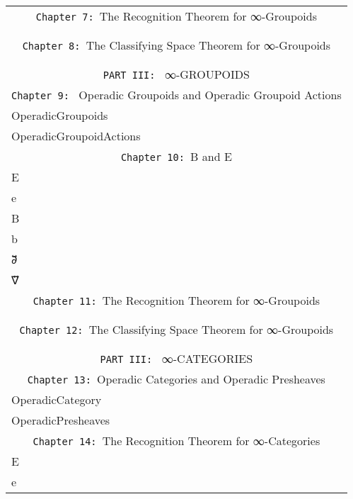 \documentclass{book}
\theoremstyle{definition}
\begin{document}
{\begin{longtable}{|| l || l ||}
\hline
  & \\
\hline \hline
\multicolumn{2}{||c||}{\texttt{Chapter 7: }The Recognition Theorem for ∞-Groupoids} \\
\hline \hline
 & \\
\hline
 & \\
\multicolumn{2}{||c||}{\texttt{Chapter 8: }The Classifying Space Theorem for ∞-Groupoids} \\
\hline \hline
 & \\
\hline
 & \\
\hline \hline
\multicolumn{2}{||c||}{\texttt{PART III: } ∞-GROUPOIDS} \\
\hline \hline
\multicolumn{2}{||c||}{\texttt{Chapter 9: } Operadic Groupoids and Operadic Groupoid Actions} \\
\hline \hline
OperadicGroupoids & \\
\hline 
OperadicGroupoidActions & \\
\hline \hline
\multicolumn{2}{||c||}{\texttt{Chapter 10: }B⃡ and E⃡} \\
\hline \hline
E⃡ & \\
\hline
e⃡  & \\
\hline
B⃡  & \\
\hline
b⃡  & \\
 \hline
∂⃡  & \\
\hline
∇⃡ & \\
\hline \hline
\multicolumn{2}{||c||}{\texttt{Chapter 11: }The Recognition Theorem for ∞-Groupoids} \\
\hline \hline
 & \\
\hline
 & \\
\multicolumn{2}{||c||}{\texttt{Chapter 12: }The Classifying Space Theorem for ∞-Groupoids} \\
\hline \hline
 & \\
\hline
 & \\
\hline \hline
\multicolumn{2}{||c||}{\texttt{PART III: } ∞-CATEGORIES} \\
\hline \hline
\multicolumn{2}{||c||}{\texttt{Chapter 13: }Operadic Categories and Operadic Presheaves} \\
\hline \hline
OperadicCategory & \\
\hline
OperadicPresheaves & \\
\hline \hline
\multicolumn{2}{||c||}{\texttt{Chapter 14: }The Recognition Theorem for ∞-Categories} \\
\hline \hline
E⃗  & \\ 
\hline
e⃗ & \\
\hline

\end{longtable}}
\end{document}
